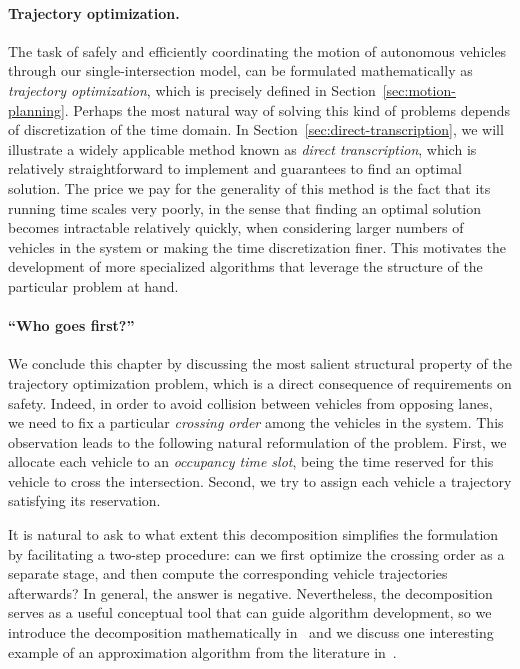 \documentclass[a4paper]{report}
\theoremstyle{definition}
\theoremstyle{plain}
\begin{document}
\paragraph{Trajectory optimization.}
The task of safely and efficiently coordinating the motion of autonomous vehicles
through our single-intersection model, can be formulated mathematically as 
\emph{trajectory optimization}, which is precisely defined in
Section~\ref{sec:motion-planning}.
Perhaps the most natural way of solving this kind of problems depends of
discretization of the time domain.
%
In Section~\ref{sec:direct-transcription}, we will illustrate a widely
applicable method known as \emph{direct
  transcription},
which is relatively straightforward to implement and guarantees to find an
optimal solution.
%
The price we pay for the generality of this method is the fact that its running
time scales very poorly, in the sense that finding an optimal solution becomes
intractable relatively quickly, when considering larger numbers of vehicles in
the system or making the time discretization finer.
%
This motivates the development of more specialized algorithms that leverage
the structure of the particular problem at hand.

\paragraph{``Who goes first?''}
We conclude this chapter by discussing the most salient structural property of
the trajectory optimization problem, which is a direct consequence of
requirements on safety.
%
Indeed, in order to avoid collision between vehicles from opposing lanes, we
need to fix a particular \emph{crossing order} among the vehicles in the system.
%
This observation leads to the following natural reformulation of the problem.
First, we allocate each vehicle to an \emph{occupancy time slot}, being the time
reserved for this vehicle to cross the intersection. Second, we try to assign
each vehicle a trajectory satisfying its reservation.

It is natural to ask to what extent this decomposition simplifies the
formulation by facilitating a two-step procedure: can we first optimize the
crossing order as a separate stage, and then compute the corresponding vehicle
trajectories afterwards?
%
In general, the answer is negative. Nevertheless, the decomposition serves as a
useful conceptual tool that can guide algorithm development, so we introduce the
decomposition mathematically in~ and we discuss one
interesting example of an approximation algorithm from the literature
in~.
\end{document}
